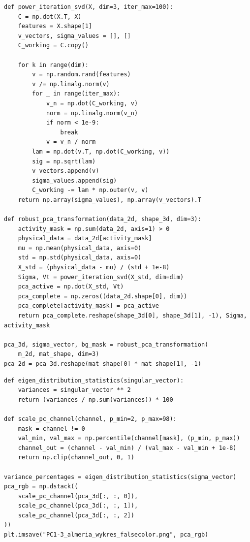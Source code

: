 \documentclass[12pt,a4paper]{article}
\begin{document}
\begin{lstlisting}[caption={Calculating PCA using the SVD method.},label={lst:pca}]
def power_iteration_svd(X, dim=3, iter_max=100):
    C = np.dot(X.T, X)
    features = X.shape[1]
    v_vectors, sigma_values = [], []
    C_working = C.copy()

    for k in range(dim):
        v = np.random.rand(features)
        v /= np.linalg.norm(v)
        for _ in range(iter_max):
            v_n = np.dot(C_working, v)
            norm = np.linalg.norm(v_n)
            if norm < 1e-9:
                break
            v = v_n / norm
        lam = np.dot(v.T, np.dot(C_working, v))
        sig = np.sqrt(lam)
        v_vectors.append(v)
        sigma_values.append(sig)
        C_working -= lam * np.outer(v, v)
    return np.array(sigma_values), np.array(v_vectors).T

def robust_pca_transformation(data_2d, shape_3d, dim=3):
    activity_mask = np.sum(data_2d, axis=1) > 0
    physical_data = data_2d[activity_mask]
    mu = np.mean(physical_data, axis=0)
    std = np.std(physical_data, axis=0)
    X_std = (physical_data - mu) / (std + 1e-8)
    Sigma, Vt = power_iteration_svd(X_std, dim=dim)
    pca_active = np.dot(X_std, Vt)
    pca_complete = np.zeros((data_2d.shape[0], dim))
    pca_complete[activity_mask] = pca_active
    return pca_complete.reshape(shape_3d[0], shape_3d[1], -1), Sigma, activity_mask

pca_3d, sigma_vector, bg_mask = robust_pca_transformation(
    m_2d, mat_shape, dim=3)
pca_2d = pca_3d.reshape(mat_shape[0] * mat_shape[1], -1)
\end{lstlisting}

\begin{lstlisting}[caption={Variance plot and false color composite.},label={lst:variance-falsecolor}]
def eigen_distribution_statistics(singular_vector):
    variances = singular_vector ** 2
    return (variances / np.sum(variances)) * 100

def scale_pc_channel(channel, p_min=2, p_max=98):
    mask = channel != 0
    val_min, val_max = np.percentile(channel[mask], (p_min, p_max))
    channel_out = (channel - val_min) / (val_max - val_min + 1e-8)
    return np.clip(channel_out, 0, 1)

variance_percentages = eigen_distribution_statistics(sigma_vector)
pca_rgb = np.dstack((
    scale_pc_channel(pca_3d[:, :, 0]),
    scale_pc_channel(pca_3d[:, :, 1]),
    scale_pc_channel(pca_3d[:, :, 2])
))
plt.imsave("PC1-3_almeria_wykres_falsecolor.png", pca_rgb)
\end{lstlisting}
\end{document}
